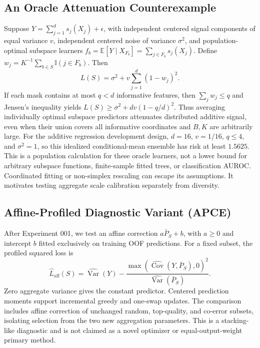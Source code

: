 \subsection{An Oracle Attenuation Counterexample}
Suppose $Y=\sum_{j=1}^d s_j(X_j)+\epsilon$, with independent centered signal
components of equal variance $v$, independent centered noise of variance
$\sigma^2$, and population-optimal subspace learners
$f_b=\mathbb E[Y\mid X_{F_b}]=\sum_{j\in F_b}s_j(X_j)$.
Define $w_j=K^{-1}\sum_{b\in S}\mathbb I(j\in F_b)$. Then
\begin{equation}
L(S)=\sigma^2+v\sum_{j=1}^d(1-w_j)^2.
\end{equation}
If each mask contains at most $q<d$ informative features, then
$\sum_j w_j\le q$ and Jensen's inequality yields
$L(S)\ge\sigma^2+dv(1-q/d)^2$. Thus averaging individually optimal subspace
predictors attenuates distributed additive signal, even when their union covers
all informative coordinates and $B,K$ are arbitrarily large. For the additive
regression development design, $d=16$, $v=1/16$, $q\le4$, and $\sigma^2=1$,
so this idealized conditional-mean ensemble has risk at least $1.5625$.
This is a population calculation for these oracle learners, not a lower bound
for arbitrary subspace functions, finite-sample fitted trees, or classification
AUROC. Coordinated fitting or non-simplex rescaling can escape its assumptions.
It motivates testing aggregate scale calibration separately from diversity.

\subsection{Affine-Profiled Diagnostic Variant (APCE)}
After Experiment 001, we test an affine correction $a\bar P_S+b$, with $a\ge0$
and intercept $b$ fitted exclusively on training OOF predictions. For a fixed
subset, the profiled squared loss is
\begin{equation}
\widehat L_{\mathrm{aff}}(S)=\widehat{\operatorname{Var}}(Y)
-\frac{\max(\widehat{\operatorname{Cov}}(Y,\bar P_S),0)^2}
{\widehat{\operatorname{Var}}(\bar P_S)}.
\end{equation}
Zero aggregate variance gives the constant predictor. Centered prediction moments
support incremental greedy and one-swap updates. The comparison includes affine
correction of unchanged random, top-quality, and co-error subsets, isolating
selection from the two new aggregation parameters. This is a stacking-like
diagnostic and is not claimed as a novel optimizer or equal-output-weight primary method.

